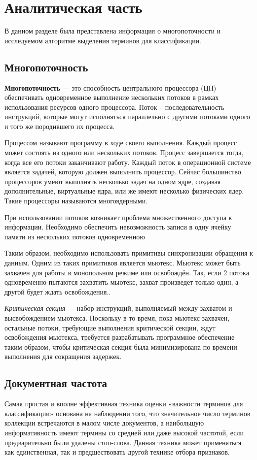 \chapter{Аналитическая часть}

В данном разделе была представлена информация о многопоточности и исследуемом алгоритме выделения терминов для классификации.

\section{Многопоточность}
\textbf{Многопоточность} \cite{threads} --- это способность центрального процессора (ЦП) обеспечивать одновременное выполнение нескольких потоков в рамках использования ресурсов одного процессора. Поток -- последовательность инструкций, которые могут исполняться параллельно с другими потоками одного и того же породившего их процесса.

Процессом называют программу в ходе своего выполнения. Каждый процесс может состоять из одного или нескольких потоков.
Процесс завершается тогда, когда все его потоки заканчивают работу.
Каждый поток в операционной системе является задачей, которую должен выполнить процессор. Сейчас большинство процессоров умеют выполнять несколько задач на одном ядре, создавая дополнительные, виртуальные ядра, или же имеют несколько физических ядер. Такие процессоры называются многоядерными. 

При использовании потоков возникает проблема множественного доступа к информации. Необходимо обеспечить невозможность записи в одну ячейку памяти из нескольких потоков одновременною

Таким образом, необходимо использовать примитивы синхронизации обращения к данным. Одним из таких примитивов является мьютекс. 
Мьютекс может быть захвачен для работы в монопольном режиме или освобождён. 
Так, если 2 потока одновременно пытаются захватить мьютекс, захват произведет только один, а другой будет ждать освобождения.. 

\textit{Критическая секция} --- набор инструкций, выполняемый между захватом и высвобождением мьютекса. 
Поскольку в то время, пока мьютекс захвачен, остальные потоки, требующие выполнения критической секции, ждут освобождения мьютекса, требуется разрабатывать программное обеспечение таким образом, чтобы критическая секция была минимизирована по времени выполнения для сокращения задержек.

\section{Документная частота}
Самая простая и вполне эффективная \cite{DF} техника оценки «важности терминов для классификации» основана на наблюдении того, что значительное число терминов коллекции встречаются в малом числе документов, а наибольшую информативность имеют термины со средней или даже высокой частотой, если предварительно были удалены стоп-слова. Данная техника может применяться как единственная, так и предшествовать другой технике отбора признаков.

